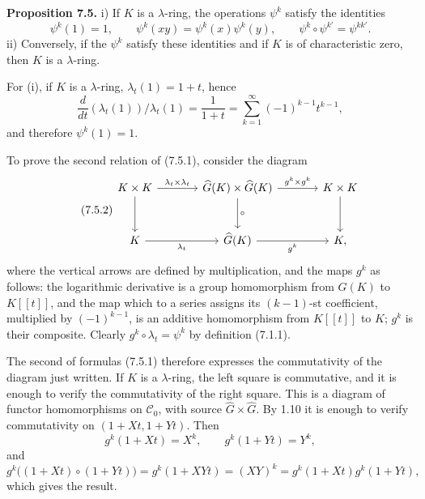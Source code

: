 \textbf{Proposition 7.5.} i) If \(K\) is a \(\lambda\)-ring, the operations \(\psi^k\) satisfy the identities
\begin{equation}\tag{7.5.1}
  \psi^k(1)=1,\qquad
  \psi^k(xy)=\psi^k(x)\psi^k(y),\qquad
  \psi^k\circ\psi^{k'}=\psi^{kk'}.
\end{equation}
ii) Conversely, if the \(\psi^k\) satisfy these identities and if \(K\) is of characteristic zero, then \(K\) is a \(\lambda\)-ring.

For (i), if \(K\) is a \(\lambda\)-ring, \(\lambda_t(1)=1+t\), hence
\[
  \frac{d}{dt}(\lambda_t(1))/\lambda_t(1)
  =
  \frac1{1+t}
  =
  \sum_{k=1}^{\infty}(-1)^{k-1}t^{k-1},
\]
and therefore \(\psi^k(1)=1\).

To prove the second relation of (7.5.1), consider the diagram
\begin{equation}\tag{7.5.2}
\begin{tikzcd}[column sep=large,row sep=large]
K\times K \arrow[r,"\lambda_t\times\lambda_t"] \arrow[d] &
\widehat G(K)\times\widehat G(K) \arrow[r,"g^k\times g^k"] \arrow[d,"\circ"] &
K\times K \arrow[d]\\
K \arrow[r,"\lambda_t"'] &
\widehat G(K) \arrow[r,"g^k"'] &
K ,
\end{tikzcd}
\end{equation}
where the vertical arrows are defined by multiplication, and the maps \(g^k\) as follows: the logarithmic derivative is a group homomorphism from \(G(K)\) to \(K[[t]]\), and the map which to a series assigns its \((k-1)\)-st coefficient, multiplied by \((-1)^{k-1}\), is an additive homomorphism from \(K[[t]]\) to \(K\); \(g^k\) is their composite. Clearly \(g^k\circ\lambda_t=\psi^k\) by definition (7.1.1).

The second of formulas (7.5.1) therefore expresses the commutativity of the diagram just written. If \(K\) is a \(\lambda\)-ring, the left square is commutative, and it is enough to verify the commutativity of the right square. This is a diagram of functor homomorphisms on \(\mathscr C_0\), with source \(\widehat G\times\widehat G\). By 1.10 it is enough to verify commutativity on \((1+Xt,1+Yt)\). Then
\[
  g^k(1+Xt)=X^k,\qquad
  g^k(1+Yt)=Y^k,
\]
and
\[
  g^k\bigl((1+Xt)\circ(1+Yt)\bigr)
  =
  g^k(1+XYt)
  =
  (XY)^k
  =
  g^k(1+Xt)g^k(1+Yt),
\]
which gives the result.

